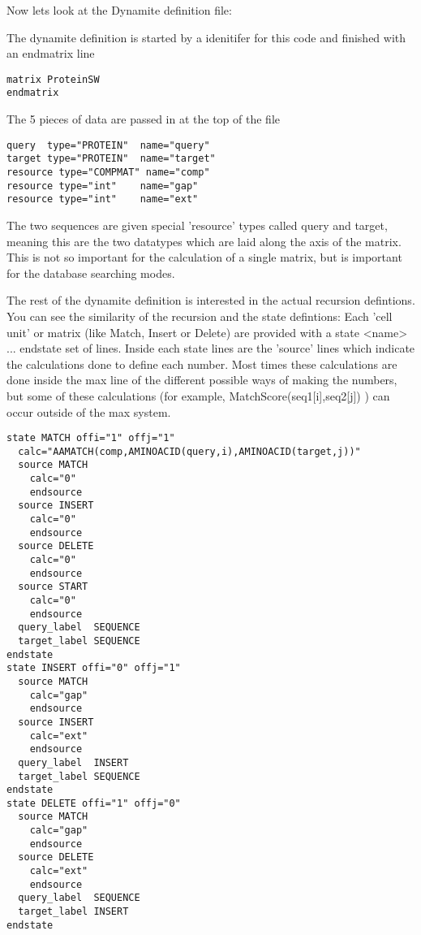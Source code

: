 Now lets look at the Dynamite definition file:

The dynamite definition is started by a idenitifer for this code
and finished with an endmatrix line

\begin{verbatim}
matrix ProteinSW
endmatrix
\end{verbatim}

The 5 pieces of data are passed in at the top of the file

\begin{verbatim}
query  type="PROTEIN"  name="query"  
target type="PROTEIN"  name="target"
resource type="COMPMAT" name="comp"
resource type="int"    name="gap"
resource type="int"    name="ext"
\end{verbatim}

The two sequences are given special 'resource' types called query and
target, meaning this are the two datatypes which are laid along the
axis of the matrix. This is not so important for the calculation of a
single matrix, but is important for the database searching modes.

The rest of the dynamite definition is interested in the actual
recursion defintions.  You can see the similarity of the recursion and
the state defintions: Each 'cell unit' or matrix (like Match, Insert
or Delete) are provided with a state <name> ... endstate set of
lines. Inside each state lines are the 'source' lines which indicate
the calculations done to define each number. Most times these
calculations are done inside the max line of the different possible
ways of making the numbers, but some of these calculations (for
example, MatchScore(seq1[i],seq2[j]) ) can occur outside of the max
system.


\begin{verbatim}
state MATCH offi="1" offj="1" 
  calc="AAMATCH(comp,AMINOACID(query,i),AMINOACID(target,j))"
  source MATCH
    calc="0"
    endsource
  source INSERT
    calc="0"
    endsource
  source DELETE
    calc="0"
    endsource
  source START
    calc="0"
    endsource
  query_label  SEQUENCE
  target_label SEQUENCE
endstate
state INSERT offi="0" offj="1"
  source MATCH
    calc="gap"
    endsource
  source INSERT
    calc="ext"
    endsource
  query_label  INSERT
  target_label SEQUENCE
endstate
state DELETE offi="1" offj="0"
  source MATCH
    calc="gap"
    endsource
  source DELETE
    calc="ext"
    endsource
  query_label  SEQUENCE
  target_label INSERT
endstate
\end{verbatim}


